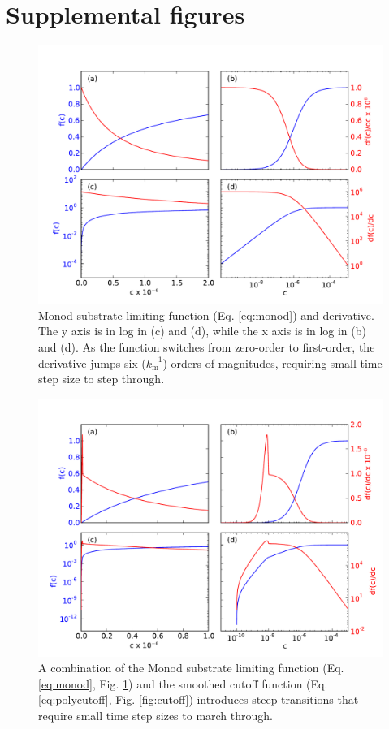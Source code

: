 \documentclass[gmd, manuscript]{copernicus}
\begin{document}
\section{Supplemental figures}    %

\begin{figure}[h]
\includegraphics[width=1.0\textwidth]{../figs/fig03/fig03monod.pdf}
\caption{Monod substrate limiting function (Eq. \ref{eq:monod}) and derivative.
The y axis is in log in (c) and (d), while the x
axis is in log in (b) and (d). As the function switches from zero-order to
first-order, the derivative jumps six ($k_\text{m}^{-1}$) orders of magnitudes,
requiring small time step size to step through.}
\label{fig:monod}
\end{figure}


\begin{figure}[h]
\includegraphics[width=1.0\textwidth]{../figs/fig04/fig04monodcutoff.pdf}
\caption{A combination of the Monod substrate limiting function (Eq.
\ref{eq:monod}, Fig. \ref{fig:monod}) and the smoothed
cutoff function (Eq. \ref{eq:polycutoff}, Fig.
\ref{fig:cutoff}) introduces steep transitions that require small time step
sizes to march through.}
\label{fig:monodcutoff}
\end{figure}
\end{document}
